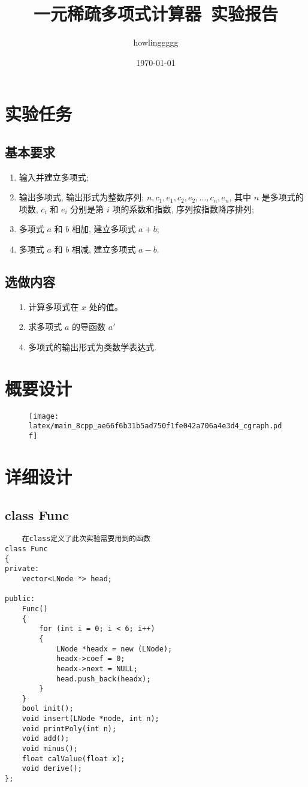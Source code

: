 \documentclass[10pt, a4paper, oneside]{ctexart}
\title{\textbf{一元稀疏多项式计算器\ 实验报告}}
\author{howlinggggg}
\date{\today}
\begin{document}
\maketitle
\section{实验任务}
\subsection{基本要求}
\begin{enumerate}
	\item 输入并建立多项式;
	\item 输出多项式, 输出形式为整数序列; $n, c_1, e_1, c_2, e_2, \dots, c_n, e_n$, 其中 $n$ 是多项式的项数, $c_i$ 和 $e_i$ 分别是第 $i$ 项的系数和指数, 序列按指数降序排列;
	\item 多项式 $a$ 和 $b$ 相加, 建立多项式 $a+b$;
	\item 多项式 $a$ 和 $b$ 相减, 建立多项式 $a-b$.
\end{enumerate}
\subsection{选做内容}
\begin{enumerate}
	\item [1.]计算多项式在 $x$ 处的值。
	\item [2.]求多项式 $a$ 的导函数 $a'$
	\item [4.]多项式的输出形式为类数学表达式.
\end{enumerate}

\section{概要设计}
\begin{figure*}[htbp]
	\centering
	\texttt{[image: latex/main\_8cpp\_ae66f6b31b5ad750f1fe042a706a4e3d4\_cgraph.pdf]}
\end{figure*}
\section{详细设计}
\subsection{class Func}
\begin{lstlisting}
	在class定义了此次实验需要用到的函数
class Func
{
private:
    vector<LNode *> head;

public:
    Func()
    {
        for (int i = 0; i < 6; i++)
        {
            LNode *headx = new (LNode);
            headx->coef = 0;
            headx->next = NULL;
            head.push_back(headx);
        }
    }
    bool init();
    void insert(LNode *node, int n);
    void printPoly(int n);
    void add();
    void minus();
    float calValue(float x);
    void derive();
};
\end{lstlisting}
\end{document}
